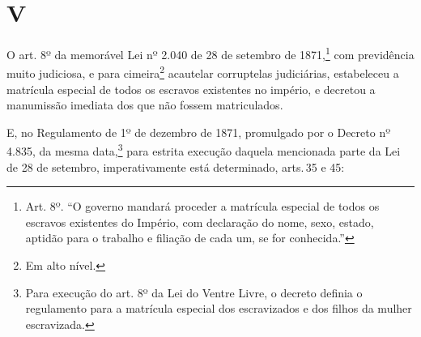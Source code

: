 \section*{V}

O art. 8º da memorável Lei nº 2.040 de 28 de setembro de 1871,\footnote{
  Art. 8º. ``O governo mandará proceder a matrícula especial de todos os
  escravos existentes do Império, com declaração do nome, sexo, estado,
  aptidão para o trabalho e filiação de cada um, se for conhecida.''} com
previdência muito judiciosa, e para cimeira\footnote{Em alto nível.}
acautelar corruptelas judiciárias, estabeleceu a matrícula especial de
todos os escravos existentes no império, e decretou a manumissão
imediata dos que não fossem matriculados.

E, no Regulamento de 1º de dezembro de 1871, promulgado por o Decreto nº
4.835, da mesma data,\footnote{Para execução do art. 8º da Lei do
  Ventre Livre, o decreto definia o regulamento para a matrícula
  especial dos escravizados e dos filhos da mulher escravizada.} para
estrita execução daquela mencionada parte da Lei de 28 de setembro,
imperativamente está determinado, arts.\,35 e 45:

